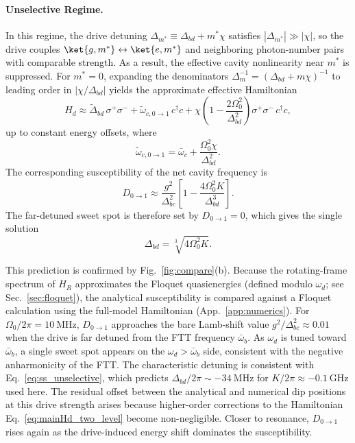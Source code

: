 \paragraph{Unselective Regime.}
In this regime, the drive detuning \(\Delta_{m^\ast}\equiv \Delta_{bd}+m^\ast\chi\) satisfies \( |\Delta_{m^\ast}|\gg|\chi| \), so the drive couples
\(\ket{g,m^\ast}\leftrightarrow\ket{e,m^\ast}\) and neighboring photon-number pairs with comparable strength.
As a result, the effective cavity nonlinearity near \(m^\ast\) is suppressed.
For \(m^\ast=0\), expanding the denominators
\(\Delta_m^{-1}=(\Delta_{bd}+m\chi)^{-1}\) to leading order in \(|\chi/\Delta_{bd}|\) yields the approximate effective Hamiltonian
\begin{equation}
\label{eq:Hd_far_detuned}
H_d \approx
\widetilde{\Delta}_{bd}\,\sigma^+\sigma^-
+\widetilde{\omega}_{c,0\rightarrow 1}\,c^\dagger c
+\chi\left(1-\frac{2\Omega_0^2}{\Delta_{bd}^2}\right)\sigma^+\sigma^-\,c^\dagger c ,
\end{equation}
up to constant energy offsets, where
\begin{equation}
\widetilde{\omega}_{c,0\rightarrow 1}=\bar{\omega}_c+\frac{\Omega_0^2\chi}{\Delta_{bd}^2}.
\end{equation}
The corresponding susceptibility of the net cavity frequency is
\begin{equation}
\label{eq:D01_unselective}
D_{0 \rightarrow 1}
\approx \frac{g^2}{\Delta_{bc}^2}\left[1-\frac{4\Omega_0^2K}{\Delta_{bd}^3}\right].
\end{equation}
The far-detuned sweet spot is therefore set by \(D_{0 \rightarrow 1}=0\), which gives the single solution
\begin{equation}
\label{eq:ss_unselective}
\Delta_{bd}=\sqrt[3]{4\Omega_0^2K}.
\end{equation}

This prediction is confirmed by Fig.~\ref{fig:compare}(b).
Because the rotating-frame spectrum of \(H_R\) approximates the Floquet quasienergies (defined modulo \(\omega_d\); see Sec.~\ref{sec:floquet}), the analytical susceptibility is compared against a Floquet calculation using the full-model Hamiltonian (App.~\ref{app:numerics}).
For \(\Omega_0/2\pi=10~\mathrm{MHz}\), \(D_{0 \rightarrow 1}\) approaches the bare Lamb-shift value \(g^2/\Delta_{bc}^2\approx0.01\) when the drive is far detuned from the FTT frequency \(\bar{\omega}_b\).
As \(\omega_d\) is tuned toward \(\bar{\omega}_b\), a single sweet spot appears on the \(\omega_d>\bar{\omega}_b\) side, consistent with the negative anharmonicity of the FTT.
The characteristic detuning is consistent with Eq.~\eqref{eq:ss_unselective}, which predicts \(\Delta_{bd}/2\pi\sim -34~\mathrm{MHz}\) for \(K/2\pi\approx-0.1~\mathrm{GHz}\) used here.
The residual offset between the analytical and numerical dip positions at this drive strength arises because higher-order corrections to the Hamiltonian Eq.~\eqref{eq:mainHd_two_level} become non-negligible.
Closer to resonance, \(D_{0 \rightarrow 1}\) rises again as the drive-induced energy shift dominates the susceptibility.


